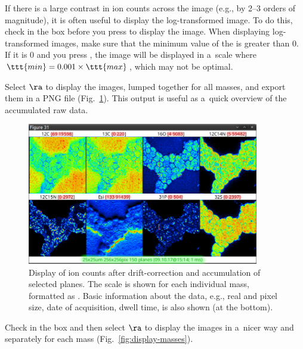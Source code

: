 \bul If there is a large contrast in ion counts across the image (e.g., by 2--3 orders of magnitude), it is often useful to display the log-transformed image. To do this, check  in the  box before you press  to display the image. When displaying log-transformed images, make sure that the minimum value of the  is greater than 0. If it is 0 and you press , the image will be displayed in a~scale where $\ttt{min} = 0.001\times\ttt{max}$, which may not be optimal.

\s Select  $\ra$  to display the images, lumped together for all masses, and export them in a PNG file (Fig.~\ref{fig:display-accu-planes}). This output is useful as a~quick overview of the accumulated raw data.

\begin{figure}[!ht]
\centering
\includegraphics[width=0.9\textwidth]{figs3/LANS-display-accu-planes}
\caption{\label{fig:display-accu-planes}%
Display of ion counts after drift-correction and accumulation of selected planes. The scale is shown for each individual mass, formatted as . Basic information about the data, e.g., real and pixel size, date of acquisition, dwell time, is also shown (at the bottom).}
\end{figure}

\s Check  in the  box and then select  $\ra$  to display the images in a~nicer way and separately for each mass (Fig.~\ref{fig:display-masses}). 

